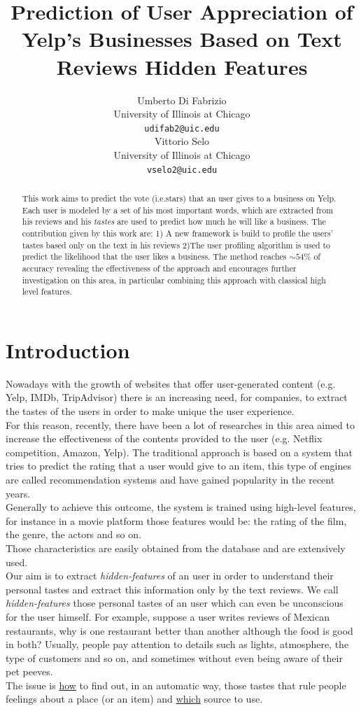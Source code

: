 \documentclass[11pt]{article}
\title{Prediction of User Appreciation of Yelp's Businesses Based on Text Reviews Hidden Features}
\author{Umberto Di Fabrizio \\
	University of Illinois at Chicago\\
	{\tt udifab2@uic.edu} \\\And
	Vittorio Selo \\
	University of Illinois at Chicago\\
	{\tt vselo2@uic.edu} \\}
\date{}
\begin{document}
\maketitle
\begin{abstract}
	This work aims to predict the vote (i.e.stars) that an user gives to a business on Yelp. Each user is modeled by a set of his most important words, which are extracted from his reviews and his \textit{tastes} are used to predict how much he will like a business. The contribution given by this work are: 1) A new framework is build to profile the users' tastes based only on the text in his reviews 2)The user profiling algorithm is used to predict the likelihood that the user likes a business. The method reaches $\sim 54\%$ of accuracy revealing the effectiveness of the approach and encourages further investigation on this area, in particular combining this approach with classical high level features.
\end{abstract}

\section{Introduction}

Nowadays with the growth of websites that offer user-generated content (e.g. Yelp, IMDb, TripAdvisor) there is an increasing need, for companies, to extract the tastes of the users in order to make unique the user experience.\\
For this reason, recently, there have been a lot of researches in this area aimed to increase the effectiveness of the contents provided to the user (e.g. Netflix competition\cite{Netflix}, Amazon, Yelp\cite{Nikulin}).
The traditional approach is based on a system that tries to predict the rating that a user would give to an item, this type of engines are called recommendation systems and have gained popularity in the recent years.\\
Generally to achieve this outcome, the system is trained using high-level features, for instance in a movie platform those features would be: the rating of the film, the genre, the actors and so on.\\
Those characteristics are easily obtained from the database and are extensively used.\\
Our aim is to extract \textit{hidden-features} of an user in order to understand their personal tastes and extract this information only by the text reviews.
We call \textit{hidden-features} those personal tastes of an user which can even be unconscious for the user himself. 
For example, suppose a user writes reviews of Mexican restaurants, why is one restaurant better than another although the food is good in both? Usually, people pay attention to details such as lights, atmosphere, the type of customers and so on, and sometimes without even being aware of their pet peeves.\\
The issue is \underline{how} to find out, in an automatic way, those tastes that rule people feelings about a place (or an item) and \underline{which} source to use.\\
\end{document}
